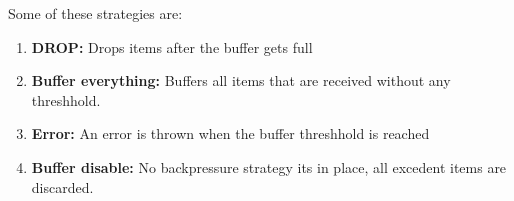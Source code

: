 	Some of these strategies are:
	\begin{enumerate}
		\item \textbf{DROP:} Drops items after the buffer gets full
		\item \textbf{Buffer everything:} Buffers all items that are received without any threshhold.
		\item \textbf{Error:} An error is thrown when the buffer threshhold is reached
		\item \textbf{Buffer disable:} No backpressure strategy its in place, all excedent items are discarded.
	\end{enumerate}
	\clearpage
